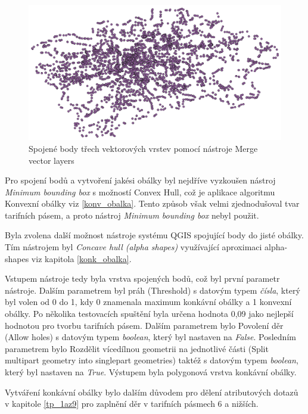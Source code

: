 \begin{figure}[H] \centering
    \includegraphics[width=400pt]{./pictures/merged-P0B.png}
    \caption[Spojené body třech vektorových vrstev pomocí nástroje Merge vector layers]{Spojené body třech vektorových vrstev pomocí nástroje Merge vector layers}
	\label{fig:merged-P0B}              
\end{figure} 

Pro spojení bodů a vytvoření jakési obálky byl nejdříve vyzkoušen nástroj \textit{Minimum bounding box} s možností Convex Hull,
což je aplikace algoritmu Konvexní obálky viz \ref{konv_obalka}. Tento způsob však velmi zjednodušoval tvar
tarifních pásem, a proto nástroj \textit{Minimum bounding box} nebyl použit.

Byla zvolena další možnost nástroje systému QGIS spojující body do jisté obálky. Tím nástrojem byl \textit{Concave hull (alpha shapes)} 
využívající aproximaci alpha-shapes viz kapitola \ref{konk_obalka}.

Vstupem nástroje tedy byla vrstva spojených bodů, což byl první parametr
nástroje. Dalším parametrem byl práh (Threshold) s datovým typem \textit{čísla}, který byl volen od 0 do 1,
kdy 0 znamenala maximum konkávní obálky a 1 konvexní obálky. Po několika testovacích spuštění byla 
určena hodnota 0,09 jako nejlepší hodnotou pro tvorbu tarifních pásem. Dalším parametrem bylo Povolení děr (Allow holes) 
s datovým typem \textit{boolean}, který byl nastaven na \textit{False}.
Posledním parametrem bylo Rozdělit vícedílnou geometrii na jednotlivé části (Split multipart geometry 
into singlepart geometries) taktéž s datovým typem \textit{boolean}, který byl nastaven na \textit{True}.  
Výstupem byla polygonová vrstva konkávní obálky. 

Vytváření konkávní obálky bylo dalším důvodem pro dělení atributových dotazů v kapitole \ref{tp_1az9} pro 
zaplnění děr v tarifních pásmech 6 a nižších.  

